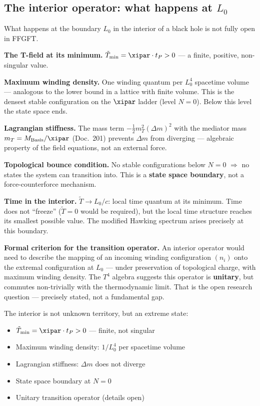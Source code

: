 \subsection{The interior operator: what happens at $L_0$}

What happens at the boundary $L_0$ in the interior of a black hole is not fully open in FFGFT.

\textbf{The T-field at its minimum.}
$\tilde{T}_\text{min} = \xipar \cdot t_P > 0$ --- a finite, positive, non-singular value.

\textbf{Maximum winding density.}
One winding quantum per $L_0^4$ spacetime volume --- analogous to the lower bound in a lattice with finite volume. This is the densest stable configuration on the $\xipar$ ladder (level $N = 0$). Below this level the state space ends.

\textbf{Lagrangian stiffness.}
The mass term $-\frac{1}{2}m_T^2(\Delta m)^2$ with the mediator mass $m_T = M_\mathrm{Basis}/\xipar$ (Doc.~201) prevents $\Delta m$ from diverging --- algebraic property of the field equations, not an external force.

\textbf{Topological bounce condition.}
No stable configurations below $N = 0$ $\Rightarrow$ no states the system can transition into. This is a \textbf{state space boundary}, not a force-counterforce mechanism.

\textbf{Time in the interior.}
$\tilde{T} \rightarrow L_0/c$: local time quantum at its minimum. Time does not ``freeze'' ($\tilde{T} = 0$ would be required), but the local time structure reaches its smallest possible value. The modified Hawking spectrum arises precisely at this boundary.

\textbf{Formal criterion for the transition operator.}
An interior operator would need to describe the mapping of an incoming winding configuration $(n_i)$ onto the extremal configuration at $L_0$ --- under preservation of topological charge, with maximum winding density. The $T^4$ algebra suggests this operator is \textbf{unitary}, but commutes non-trivially with the thermodynamic limit. That is the open research question --- precisely stated, not a fundamental gap.

\begin{erkenntnis}
The interior is not unknown territory, but an extreme state:
\begin{itemize}
  \item $\tilde{T}_\text{min} = \xipar \cdot t_P > 0$ --- finite, not singular
  \item Maximum winding density: $1/L_0^4$ per spacetime volume
  \item Lagrangian stiffness: $\Delta m$ does not diverge
  \item State space boundary at $N = 0$
  \item Unitary transition operator (details open)
\end{itemize}
\end{erkenntnis}


